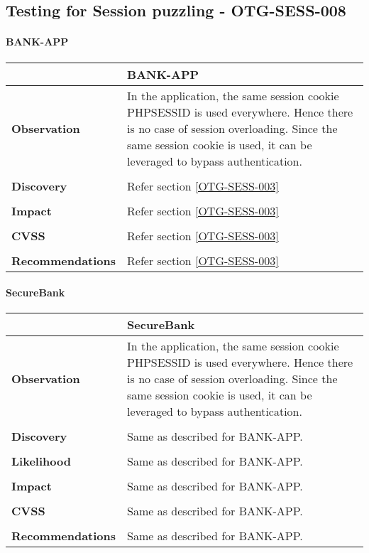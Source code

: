 \subsection{Testing for Session puzzling - OTG-SESS-008}
\paragraph{BANK-APP} \mbox{}
\begin{longtable*}{p{.30\textwidth} | p{.70\textwidth}}
    \hline
    & \textbf{BANK-APP} \\
    \hline
    \textbf{Observation} &
       In the application, the same session cookie PHPSESSID is used everywhere. Hence there is no case of session overloading. Since the same session cookie is used, it can be leveraged to bypass authentication.
    \\\\
    \textbf{Discovery} &
        Refer section \ref{OTG-SESS-003}
    \\\\
    \textbf{Impact} &
        Refer section \ref{OTG-SESS-003}
    \\\\
    \textbf{CVSS} &
       Refer section \ref{OTG-SESS-003}
    \\\\
    \textbf{Recommendations} &
       Refer section \ref{OTG-SESS-003}\\
    \hline
\end{longtable*}
\clearpage
\paragraph{SecureBank} \mbox{}
\begin{longtable*}{p{.30\textwidth} | p{.70\textwidth}}
    \hline
    & \textbf{SecureBank} \\
    \hline
    \textbf{Observation} &
       In the application, the same session cookie PHPSESSID is used everywhere. Hence there is no case of session overloading. Since the same session cookie is used, it can be leveraged to bypass authentication.
    \\\\
    \textbf{Discovery} &
    	Same as described for BANK-APP.
    \\\\
    \textbf{Likelihood} &
       Same as described for BANK-APP.
    \\\\
    \textbf{Impact} &
      Same as described for BANK-APP.
    \\\\
    \textbf{CVSS} &
       Same as described for BANK-APP.
     \\\\
     \textbf{Recommendations} &
      Same as described for BANK-APP.\\
    \hline
\end{longtable*}
\clearpage